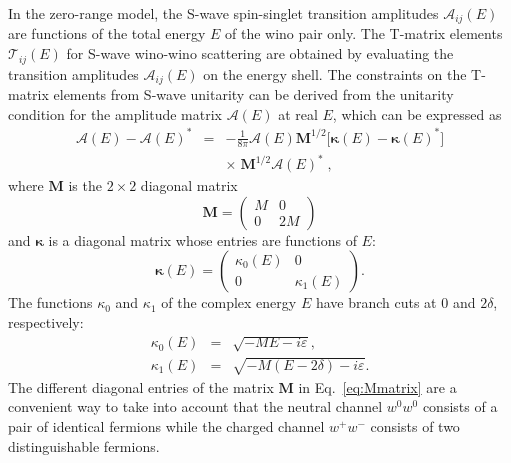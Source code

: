 \documentclass[%
 reprint,
 amsmath,amssymb,
 aps,
]{revtex4-1}
\begin{document}
In the zero-range model, the S-wave spin-singlet transition amplitudes $\mathcal{A}_{ij}(E)$ are functions of the total energy $E$ of the wino pair only.
The T-matrix elements $\mathcal{T}_{ij}(E)$ for  S-wave wino-wino scattering are obtained by evaluating the transition amplitudes $\mathcal{A}_{ij}(E)$ on the energy shell.  
The constraints on the T-matrix elements from S-wave unitarity can be derived from the unitarity condition for the amplitude matrix $\bm{\mathcal{A}}(E)$ at real $E$, which can be expressed as
\begin{eqnarray}
\bm{\mathcal{A}}(E)- \bm{\mathcal{A}}(E)^* &=& 
- \frac{1}{8 \pi} \bm{\mathcal{A}}(E) \bm{M}^{1/2} \Big[ \bm{\kappa}(E)  - \bm{\kappa}(E)^* \Big] 
\nonumber
\\
&&\times \;
\bm{M}^{1/2} \bm{\mathcal{A}}(E)^* \;,
\label{eq:A-unitarity}
\end{eqnarray}
where $\bm{M}$ is the $2\times2$ diagonal matrix
\begin{equation}
\label{eq:Mmatrix}
\bm{M}=
\begin{pmatrix}  M &   0   \\ 
                          0  & 2M   
\end{pmatrix}
\end{equation}
and $\bm{\kappa}$ is a diagonal matrix whose entries are functions of $E$:
\begin{equation}
\bm{\kappa}(E) =
\begin{pmatrix} \kappa_0(E)  &          0       \\ 
                                 0            & \kappa_1(E)
\end{pmatrix} .
\label{eq:kappamatrix}
\end{equation}
The functions $\kappa_0$ and $\kappa_1$ of the complex energy $E$ have branch cuts at 0 and $2\delta$, respectively:
\begin{subequations}
\begin{eqnarray}
\kappa_0(E) &=& \sqrt{-ME-i\varepsilon},
\label{eq:kappa0}
\\
\kappa_1(E) &=& \sqrt{-M(E-2\delta)-i\varepsilon}.
\label{eq:kappa1}
\end{eqnarray}
\label{eq:kappa01}%
\end{subequations}
The different diagonal entries of the matrix $\bm{M}$ in Eq.~\eqref{eq:Mmatrix} are a convenient way to take into account that the neutral channel $w^0w^0$ consists of a pair of identical fermions while the charged channel $w^+w^-$ consists of two distinguishable fermions.
\end{document}
